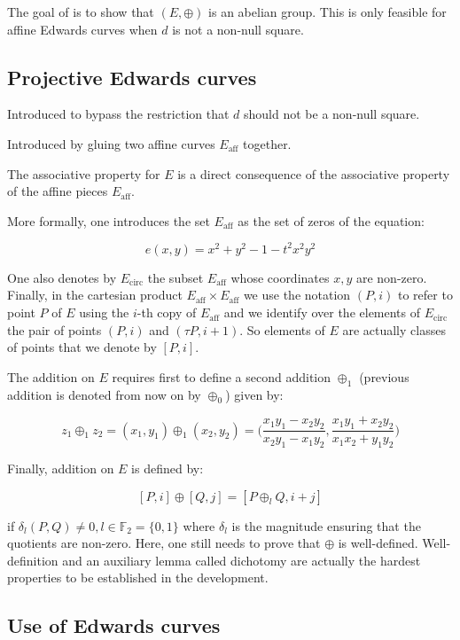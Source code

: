 The goal of \cite{hales2016group} is to show that $(E,\oplus)$ is an abelian group. This is only feasible for affine Edwards curves when $d$ is not a non-null square.

\subsection{Projective Edwards curves}

Introduced to bypass the restriction that $d$ should not be a non-null square. 

Introduced by gluing two affine curves $E_{\text{aff}}$ together. 

The associative property for $E$ is a direct consequence of the associative property of the affine pieces $E_{\text{aff}}$.

More formally, one introduces the set $E_{\text{aff}}$ as the set of zeros of the equation:

$$e(x,y) = x^2 + y^2 - 1 - t^2 x^2 y^2$$

One also denotes by $E_{\text{circ}}$ the subset $E_{\text{aff}}$ whose coordinates $x,y$ are non-zero. Finally, in the cartesian product $E_{\text{aff}} \times E_{\text{aff}}$ we use the notation $(P,i)$ to refer to point $P$ of $E$ using the $i$-th copy of $E_{\text{aff}}$ and we identify over the elements of $E_{\text{circ}}$ the pair of points $(P,i)$ and $(\tau P, i+1)$. So elements of $E$ are actually classes of points that we denote by $[P,i]$.

The addition on $E$ requires first to define a second addition $\oplus_1$ (previous addition is denoted from now on by $\oplus_0$) given by:

$$z_1 \oplus_1 z_2 = (x_1,y_1) \oplus_1 (x_2,y_2) = \Big(\frac{x_1y_1-x_2y_2}{x_2y_1 - x_1y_2},\frac{x_1y_1+x_2 y_2}{x_1 x_2 + y_1y_2}\Big)$$

Finally, addition on $E$ is defined by:

$$[P,i] \oplus [Q,j] = [P \oplus_l Q, i+j]$$

if $\delta_l(P,Q) \neq 0, l \in \mathbb{F}_2 = \{0,1\}$ where $\delta_l$ is the magnitude ensuring that the quotients are non-zero. Here, one still needs to prove that $\oplus$ is well-defined. Well-definition and an auxiliary lemma called dichotomy are actually the hardest properties to be established in the development. 

\subsection{Use of Edwards curves}

